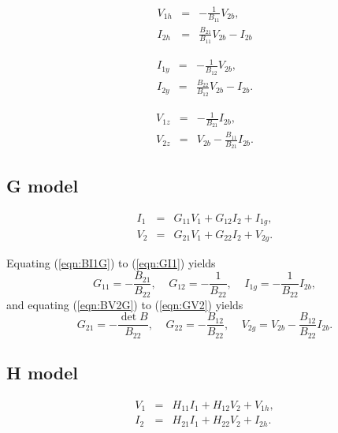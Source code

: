 \documentclass[a4paper, 12pt]{article}
\newcommand{\bigspace}{\;\;\;\;}
\newcommand{\refeqn}[1]{\mbox{(\ref{eqn:#1})}}
\begin{document}
\begin{eqnarray}
  V_{1h} & = & -\frac{1}{B_{11}} V_{2b}, \\
  I_{2h} & = & \frac{B_{21}}{B_{11}} V_{2b} - I_{2b}
\end{eqnarray}

%
\begin{eqnarray}
  I_{1y} & = & -\frac{1}{B_{12}} V_{2b}, \\
  I_{2y} & = & \frac{B_{22}}{B_{12}} V_{2b} - I_{2b}.
\end{eqnarray}

%
\begin{eqnarray}
V_{1z} & = & -\frac{1}{B_{21}} I_{2b}, \\
V_{2z} & = & V_{2b} -\frac{B_{11}}{B_{21}} I_{2b}.
\end{eqnarray}



\subsection{G model}

\begin{eqnarray}
\label{eqn:GI1}
  I_1 & = & G_{11} V_1 + G_{12} I_2 + I_{1g}, \\
  V_2 & = & G_{21} V_1 + G_{22} I_2 + V_{2g}.
\label{eqn:GV2}
\end{eqnarray}


Equating \refeqn{BI1G} to \refeqn{GI1} yields
%
\begin{equation}
 G_{11} = - \frac{B_{21}}{B_{22}}, \bigspace G_{12} = -\frac{1}{B_{22}}, \bigspace I_{1g} = -\frac{1}{B_{22}} I_{2b},
\end{equation}
%
and equating \refeqn{BV2G} to \refeqn{GV2} yields
%
\begin{equation}
  G_{21} = -\frac{\det{B}}{B_{22}}, \bigspace G_{22} = -\frac{B_{12}}{B_{22}}, \bigspace V_{2g} = V_{2b} - \frac{B_{12}}{B_{22}} I_{2b}.
\end{equation}


\subsection{H model}

\begin{eqnarray}
\label{eqn:HV1}
  V_1 & = & H_{11} I_1 + H_{12} V_2 + V_{1h}, \\
  I_2 & = & H_{21} I_1 + H_{22} V_2 + I_{2h}.
\label{eqn:HI2}
\end{eqnarray}
\end{document}
